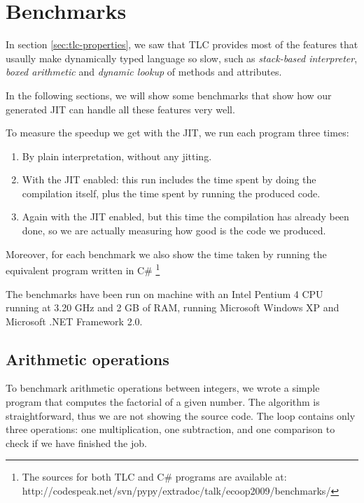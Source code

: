 \section{Benchmarks}
\label{sec:benchmarks}


In section \ref{sec:tlc-properties}, we saw that TLC provides most of the
features that usaully make dynamically typed language so slow, such as
\emph{stack-based interpreter}, \emph{boxed arithmetic} and \emph{dynamic lookup} of
methods and attributes.

In the following sections, we will show some benchmarks that show how our
generated JIT can handle all these features very well.

To measure the speedup we get with the JIT, we run each program three times:

\begin{enumerate}
\item By plain interpretation, without any jitting.
\item With the JIT enabled: this run includes the time spent by doing the
  compilation itself, plus the time spent by running the produced code.
\item Again with the JIT enabled, but this time the compilation has already
  been done, so we are actually measuring how good is the code we produced.
\end{enumerate}

Moreover, for each benchmark we also show the time taken by running the
equivalent program written in C\# \footnote{The sources for both TLC and C\#
  programs are available at:
  http://codespeak.net/svn/pypy/extradoc/talk/ecoop2009/benchmarks/}

The benchmarks have been run on machine with an Intel Pentium 4 CPU running at
3.20 GHz and 2 GB of RAM, running Microsoft Windows XP and Microsoft .NET
Framework 2.0.

\subsection{Arithmetic operations}

To benchmark arithmetic operations between integers, we wrote a simple program
that computes the factorial of a given number.  The algorithm is
straightforward, thus we are not showing the source code.  The loop contains only three operations: one
multiplication, one subtraction, and one comparison to check if we have
finished the job.

